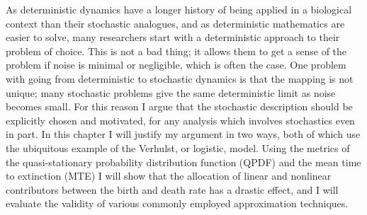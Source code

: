 As deterministic dynamics have a longer history of being applied in a biological context than their stochastic analogues, and as deterministic mathematics are easier to solve, many researchers start with a deterministic approach to their problem of choice. 
This is not a bad thing; it allows them to get a sense of the problem if noise is minimal or negligible, which is often the case. 
One problem with going from deterministic to stochastic dynamics is that the mapping is not unique; many stochastic problems give the same deterministic limit as noise becomes small. 
For this reason I argue that the stochastic description should be explicitly chosen and motivated, for any analysis which involves stochastics even in part. 
In this chapter I will justify my argument in two ways, both of which use the ubiquitous example of the Verhulst, or logistic, model. 
Using the metrics of the quasi-stationary probability distribution function (QPDF) and the mean time to extinction (MTE) I will show that the allocation of linear and nonlinear contributors between the birth and death rate has a drastic effect, and I will evaluate the validity of various commonly employed approximation techniques. 

